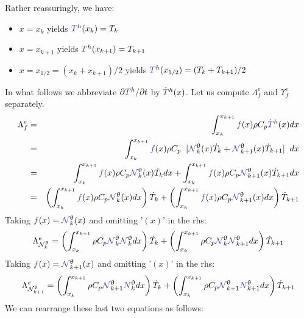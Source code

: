 Rather reassuringly, we have:
\begin{itemize}
\item $x=x_k$ yields ${\color{Violet}T}^h(x_k)=T_k$
\item $x=x_{k+1}$ yields ${\color{Violet}T}^h(x_{k+1})=T_{k+1}$
\item $x=x_{1/2}=(x_k+x_{k+1})/2$ yields ${\color{Violet}T}^h(x_{1/2})=(T_k+T_{k+1})/2$
\end{itemize}
In what follows we abbreviate $\partial {\color{Violet}T}^h/\partial t$ by $\dot{\color{Violet}T}^h(x)$.
Let us compute ${\Lambda}_f^e$ and ${\Upsilon}_f^e$ separately.
\begin{eqnarray}
{\Lambda}_f^e 
&=&\int_{x_k}^{x_{k+1}} {\color{Violet}f}(x) \rho C_p \dot {\color{Violet}T}^h(x) dx \nn\\
&=& \int_{x_k}^{x_{k+1}} {\color{Violet}f}(x) \rho C_p \;\;  [ {\color{Violet}\bN}_{k}^\uptheta(x) \dot{T}_k 
+ {\color{Violet}\bN}_{k+1}^\uptheta(x) \dot{T}_{k+1} ] \;\; dx  \nn\\
&=& \int_{x_k}^{x_{k+1}} {\color{Violet}f}(x) \rho C_p {\color{Violet}\bN}_{k}^\uptheta(x) \dot{T}_k  dx  
+ \int_{x_k}^{x_{k+1}} {\color{Violet}f}(x) 
\rho C_p {\color{Violet}\bN}_{k+1}^\uptheta(x) \dot{T}_{k+1}   dx \nn\\
&=&  \left( \int_{x_k}^{x_{k+1}} {\color{Violet}f}(x) \rho C_p  
{\color{Violet}\bN}_{k}^\uptheta(x) dx \right) \dot{T}_k  
+ \left( \int_{x_k}^{x_{k+1}} {\color{Violet}f}(x) \rho C_p 
{\color{Violet}\bN}_{k+1}^\uptheta(x) dx \right)  \dot{T}_{k+1}  \nn
\end{eqnarray}
Taking ${\color{Violet}f}(x)={\color{Violet}\bN}_k^\uptheta(x)$ and omitting '$(x)$' in the rhs:
\[
{\Lambda}_{\bN_k^\uptheta}^e=
\left( \int_{x_k}^{x_{k+1}} \rho C_p  {\color{Violet}\bN}_k^\uptheta 
{\color{Violet}\bN}_{k}^\uptheta dx \right) \dot{T}_k  
+ \left( \int_{x_k}^{x_{k+1}} \rho C_p {\color{Violet}\bN}_k^\uptheta 
{\color{Violet}\bN}_{k+1}^\uptheta dx \right)  \dot{T}_{k+1} 
\]
Taking ${\color{Violet}f}(x)={\color{Violet}\bN}_{k+1}^\uptheta(x)$ 
and omitting '$(x)$' in the rhs:
\[
{\Lambda}_{\bN_{k+1}^\uptheta}^e
= \left( \int_{x_k}^{x_{k+1}} \rho C_p {\color{Violet}\bN}_{k+1}^\uptheta 
{\color{Violet}N}_{k}^\uptheta dx \right) \dot{T}_k  
+ \left( \int_{x_k}^{x_{k+1}} \rho C_p {\color{Violet}\bN}_{k+1}^\uptheta 
{\color{Violet}N}_{k+1}^\uptheta dx \right)  \dot{T}_{k+1} 
\]
We can rearrange these last two equations as follows:

